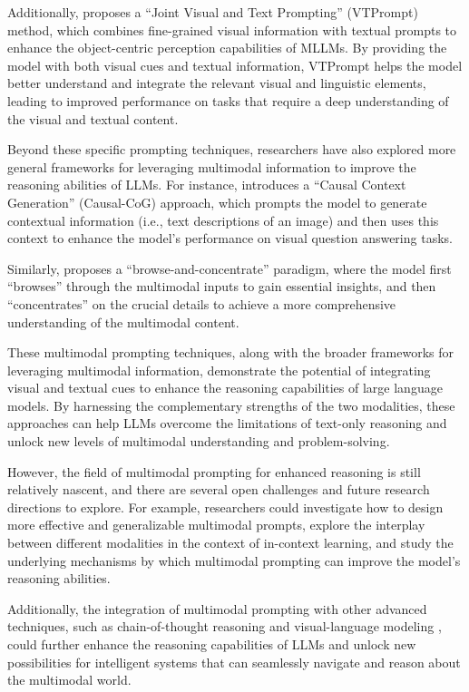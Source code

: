 \documentclass[11pt]{article}
\begin{document}
Additionally, \cite{ref312} proposes a ``Joint Visual and Text Prompting'' (VTPrompt) method, which combines fine-grained visual information with textual prompts to enhance the object-centric perception capabilities of MLLMs. By providing the model with both visual cues and textual information, VTPrompt helps the model better understand and integrate the relevant visual and linguistic elements, leading to improved performance on tasks that require a deep understanding of the visual and textual content.

Beyond these specific prompting techniques, researchers have also explored more general frameworks for leveraging multimodal information to improve the reasoning abilities of LLMs. For instance, \cite{ref313} introduces a ``Causal Context Generation'' (Causal-CoG) approach, which prompts the model to generate contextual information (i.e., text descriptions of an image) and then uses this context to enhance the model's performance on visual question answering tasks.

Similarly, \cite{ref314} proposes a ``browse-and-concentrate'' paradigm, where the model first ``browses'' through the multimodal inputs to gain essential insights, and then ``concentrates'' on the crucial details to achieve a more comprehensive understanding of the multimodal content.

These multimodal prompting techniques, along with the broader frameworks for leveraging multimodal information, demonstrate the potential of integrating visual and textual cues to enhance the reasoning capabilities of large language models. By harnessing the complementary strengths of the two modalities, these approaches can help LLMs overcome the limitations of text-only reasoning and unlock new levels of multimodal understanding and problem-solving.

However, the field of multimodal prompting for enhanced reasoning is still relatively nascent, and there are several open challenges and future research directions to explore. For example, researchers could investigate how to design more effective and generalizable multimodal prompts, explore the interplay between different modalities in the context of in-context learning, and study the underlying mechanisms by which multimodal prompting can improve the model's reasoning abilities.

Additionally, the integration of multimodal prompting with other advanced techniques, such as chain-of-thought reasoning \cite{ref94} and visual-language modeling \cite{ref315}, could further enhance the reasoning capabilities of LLMs and unlock new possibilities for intelligent systems that can seamlessly navigate and reason about the multimodal world.
\end{document}
